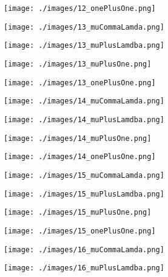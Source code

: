 \documentclass[landscape,11pt]{article}
\begin{document}
\begin{figure}
\end{figure}\begin{figure}
    \centering
    \texttt{[image: ./images/12\_onePlusOne.png]}
\end{figure}\begin{figure}
    \centering
    \texttt{[image: ./images/13\_muCommaLamda.png]}
\end{figure}\begin{figure}
    \centering
    \texttt{[image: ./images/13\_muPlusLamdba.png]}
\end{figure}\begin{figure}
    \centering
    \texttt{[image: ./images/13\_muPlusOne.png]}
\end{figure}\begin{figure}
    \centering
    \texttt{[image: ./images/13\_onePlusOne.png]}
\end{figure}\begin{figure}
    \centering
    \texttt{[image: ./images/14\_muCommaLamda.png]}
\end{figure}\begin{figure}
    \centering
    \texttt{[image: ./images/14\_muPlusLamdba.png]}
\end{figure}\begin{figure}
    \centering
    \texttt{[image: ./images/14\_muPlusOne.png]}
\end{figure}\begin{figure}
    \centering
    \texttt{[image: ./images/14\_onePlusOne.png]}
\end{figure}\begin{figure}
    \centering
    \texttt{[image: ./images/15\_muCommaLamda.png]}
\end{figure}\begin{figure}
    \centering
    \texttt{[image: ./images/15\_muPlusLamdba.png]}
\end{figure}\begin{figure}
    \centering
    \texttt{[image: ./images/15\_muPlusOne.png]}
\end{figure}\begin{figure}
    \centering
    \texttt{[image: ./images/15\_onePlusOne.png]}
\end{figure}\begin{figure}
    \centering
    \texttt{[image: ./images/16\_muCommaLamda.png]}
\end{figure}\begin{figure}
    \centering
    \texttt{[image: ./images/16\_muPlusLamdba.png]}
\end{figure}\begin{figure}

\end{figure}
\end{document}
